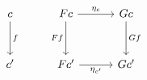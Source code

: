 \documentclass{article}
\begin{document}
    \begin{equation*}
        \begin{tikzcd}[column sep=3em, row sep=3em]
            c \ar[d, "f"] & Fc \ar[r, "\eta_c"] \ar[d, "Ff"'] & Gc \ar[d, "Gf"] \\
            c' & Fc' \ar[r, "\eta_{c'}"'] & Gc'
        \end{tikzcd}
    \end{equation*}
\end{document}

